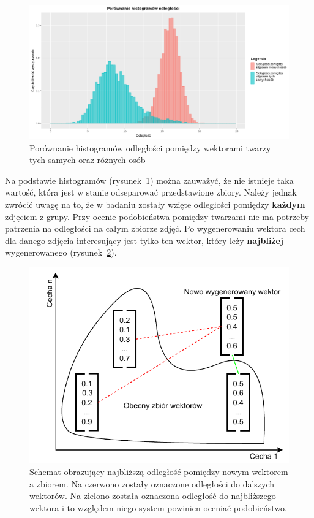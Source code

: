 \begin{figure}[H]
    \centering
    \includegraphics[width=1\textwidth]{./images/porownanie_histogramow_odleglosci}
    \caption{ Porównanie histogramów odległości pomiędzy wektorami twarzy tych samych oraz różnych osób }
    \customsource
    \label{fig:porownanie_histogramow_odleglosci}
\end{figure}

\pagebreak

Na podstawie histogramów (rysunek~\ref{fig:porownanie_histogramow_odleglosci}) można zauważyć,
że nie istnieje taka wartość, która jest w stanie odseparować przedstawione zbiory.
Należy jednak zwrócić uwagę na to, że w badaniu zostały wzięte odległości pomiędzy \textbf{każdym} zdjęciem z grupy.
Przy ocenie podobieństwa pomiędzy twarzami nie ma potrzeby patrzenia na odległości na całym zbiorze zdjęć.
Po wygenerowaniu wektora cech dla danego zdjęcia interesujący jest tylko ten wektor, który
leży \textbf{najbliżej} wygenerowanego (rysunek~\ref{fig:najmniejsze}).

\begin{figure}[H]
    \centering
    \includegraphics[width=1\textwidth]{./images/dlaczego_najmniejsze}
    \caption{ Schemat obrazujący najbliższą odległość pomiędzy nowym wektorem a zbiorem.
    Na czerwono zostały oznaczone odległości do dalszych wektorów. Na zielono została oznaczona odległość
    do najbliższego wektora i to względem niego system powinien oceniać podobieństwo.
    }
    \customsource
    \label{fig:najmniejsze}
\end{figure}

